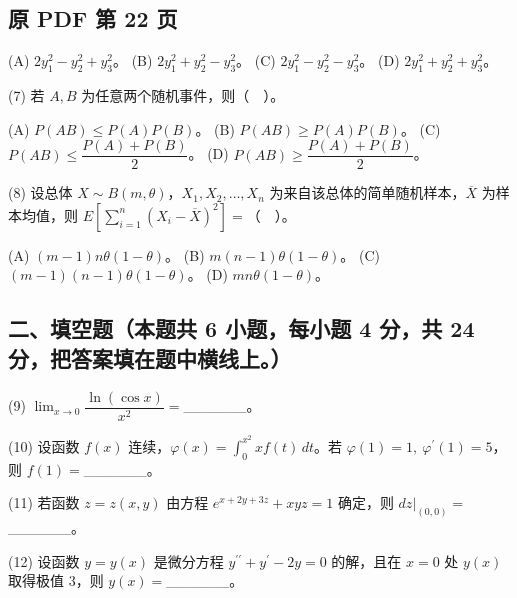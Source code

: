 \documentclass[UTF8,12pt]{ctexart}
\begin{document}
\clearpage

\subsection*{原 PDF 第 22 页}

(A) \(\displaystyle 2y_1^2-y_2^2+y_3^2\)。 (B) \(\displaystyle 2y_1^2+y_2^2-y_3^2\)。 (C) \(\displaystyle 2y_1^2-y_2^2-y_3^2\)。 (D) \(\displaystyle 2y_1^2+y_2^2+y_3^2\)。


(7) 若 \(\displaystyle A,\allowbreak B\) 为任意两个随机事件，则（　）。


(A) \(\displaystyle P(AB)\leq P(A)P(B)\)。 (B) \(\displaystyle P(AB)\geq P(A)P(B)\)。 (C) \(\displaystyle P(AB)\leq\dfrac{\displaystyle P(A)+P(B)}{\displaystyle 2}\)。 (D) \(\displaystyle P(AB)\geq\dfrac{\displaystyle P(A)+P(B)}{\displaystyle 2}\)。


(8) 设总体 \(\displaystyle X\sim B(m,\allowbreak \theta)\)，\(\displaystyle X_1,\allowbreak X_2,\allowbreak \ldots,\allowbreak X_n\) 为来自该总体的简单随机样本，\(\displaystyle \overline X\) 为样本均值，则 \(\displaystyle E\left[\displaystyle \sum_{i=1}^n(X_i-\overline X)^2\right]=\)（　）。


(A) \(\displaystyle (m-1)n\theta(1-\theta)\)。 (B) \(\displaystyle m(n-1)\theta(1-\theta)\)。 (C) \(\displaystyle (m-1)(n-1)\theta(1-\theta)\)。 (D) \(\displaystyle mn\theta(1-\theta)\)。


\subsection*{二、填空题（本题共 6 小题，每小题 4 分，共 24 分，把答案填在题中横线上。）}

(9) \(\displaystyle \lim_{x\to0}\dfrac{\displaystyle \ln(\cos x)}{\displaystyle x^2}=\)\_\_\_\_\_\_。


(10) 设函数 \(\displaystyle f(x)\) 连续，\(\displaystyle \varphi(x)=\displaystyle \int_0^{x^2}xf(t)\,dt\)。若 \(\displaystyle \varphi(1)=1,\allowbreak \ \varphi^{\prime}(1)=5\)，则 \(\displaystyle f(1)=\)\_\_\_\_\_\_。


(11) 若函数 \(\displaystyle z=z(x,\allowbreak y)\) 由方程 \(\displaystyle e^{x+2y+3z}+xyz=1\) 确定，则 \(\displaystyle dz|_{(0,\allowbreak 0)}=\)\_\_\_\_\_\_。


(12) 设函数 \(\displaystyle y=y(x)\) 是微分方程 \(\displaystyle y^{\prime\prime}+y^{\prime}-2y=0\) 的解，且在 \(\displaystyle x=0\) 处 \(\displaystyle y(x)\) 取得极值 3，则 \(\displaystyle y(x)=\)\_\_\_\_\_\_。
\end{document}
